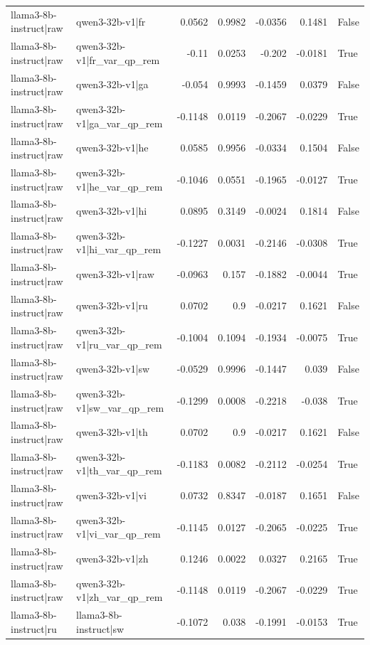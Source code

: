 \begin{table}
\begin{tabular}{l l r r r r l}
llama3-8b-instruct|raw & qwen3-32b-v1|fr & 0.0562 & 0.9982 & -0.0356 & 0.1481 & False \\
llama3-8b-instruct|raw & qwen3-32b-v1|fr_var_qp_rem & -0.11 & 0.0253 & -0.202 & -0.0181 & True \\
llama3-8b-instruct|raw & qwen3-32b-v1|ga & -0.054 & 0.9993 & -0.1459 & 0.0379 & False \\
llama3-8b-instruct|raw & qwen3-32b-v1|ga_var_qp_rem & -0.1148 & 0.0119 & -0.2067 & -0.0229 & True \\
llama3-8b-instruct|raw & qwen3-32b-v1|he & 0.0585 & 0.9956 & -0.0334 & 0.1504 & False \\
llama3-8b-instruct|raw & qwen3-32b-v1|he_var_qp_rem & -0.1046 & 0.0551 & -0.1965 & -0.0127 & True \\
llama3-8b-instruct|raw & qwen3-32b-v1|hi & 0.0895 & 0.3149 & -0.0024 & 0.1814 & False \\
llama3-8b-instruct|raw & qwen3-32b-v1|hi_var_qp_rem & -0.1227 & 0.0031 & -0.2146 & -0.0308 & True \\
llama3-8b-instruct|raw & qwen3-32b-v1|raw & -0.0963 & 0.157 & -0.1882 & -0.0044 & True \\
llama3-8b-instruct|raw & qwen3-32b-v1|ru & 0.0702 & 0.9 & -0.0217 & 0.1621 & False \\
llama3-8b-instruct|raw & qwen3-32b-v1|ru_var_qp_rem & -0.1004 & 0.1094 & -0.1934 & -0.0075 & True \\
llama3-8b-instruct|raw & qwen3-32b-v1|sw & -0.0529 & 0.9996 & -0.1447 & 0.039 & False \\
llama3-8b-instruct|raw & qwen3-32b-v1|sw_var_qp_rem & -0.1299 & 0.0008 & -0.2218 & -0.038 & True \\
llama3-8b-instruct|raw & qwen3-32b-v1|th & 0.0702 & 0.9 & -0.0217 & 0.1621 & False \\
llama3-8b-instruct|raw & qwen3-32b-v1|th_var_qp_rem & -0.1183 & 0.0082 & -0.2112 & -0.0254 & True \\
llama3-8b-instruct|raw & qwen3-32b-v1|vi & 0.0732 & 0.8347 & -0.0187 & 0.1651 & False \\
llama3-8b-instruct|raw & qwen3-32b-v1|vi_var_qp_rem & -0.1145 & 0.0127 & -0.2065 & -0.0225 & True \\
llama3-8b-instruct|raw & qwen3-32b-v1|zh & 0.1246 & 0.0022 & 0.0327 & 0.2165 & True \\
llama3-8b-instruct|raw & qwen3-32b-v1|zh_var_qp_rem & -0.1148 & 0.0119 & -0.2067 & -0.0229 & True \\
llama3-8b-instruct|ru & llama3-8b-instruct|sw & -0.1072 & 0.038 & -0.1991 & -0.0153 & True \\

\end{tabular}
\end{table}
